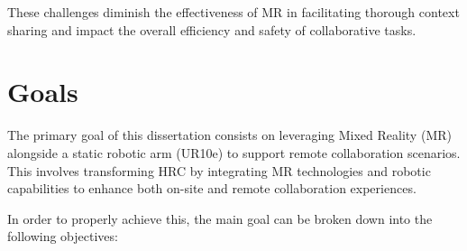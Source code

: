 These challenges diminish the effectiveness of \ac{MR} in facilitating thorough context sharing and impact the overall efficiency and safety of 
collaborative tasks.

\section{Goals}
\label{section:Goals}
% 
The primary goal of this dissertation consists on leveraging Mixed Reality (\ac{MR}) alongside a static robotic arm (UR10e) to support remote collaboration scenarios. 
This involves transforming \ac{HRC} by integrating \ac{MR} technologies and robotic capabilities to enhance both on-site and remote collaboration experiences.

In order to properly achieve this, the main goal can be broken down into the following objectives:

